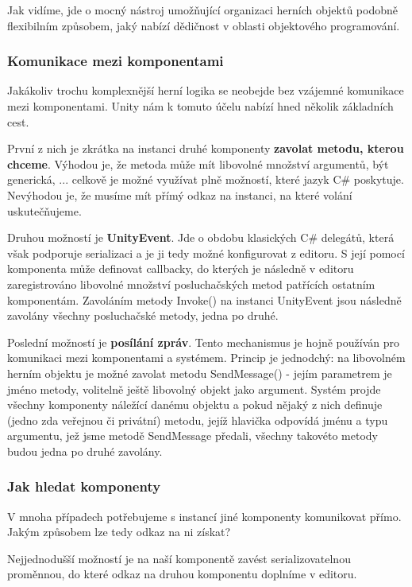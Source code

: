 Jak vidíme, jde o mocný nástroj umožňující organizaci herních objektů podobně flexibilním způsobem, jaký nabízí dědičnost v oblasti objektového programování. 

\subsubsection*{Komunikace mezi komponentami} \label{communicationBetweenComponentsSubsubsection}

Jakákoliv trochu komplexnější herní logika se neobejde bez vzájemné komunikace mezi komponentami. Unity nám k tomuto účelu nabízí hned několik základních cest.

První z nich je zkrátka na instanci druhé komponenty \textbf{zavolat metodu, kterou chceme}. Výhodou je, že metoda může mít libovolné množství argumentů, být generická, ... celkově je možné využívat plně možností, které jazyk C\# poskytuje. Nevýhodou je, že musíme mít přímý odkaz na instanci, na které volání uskutečňujeme.

Druhou možností je \textbf{UnityEvent}. Jde o obdobu klasických C\# delegátů, která však podporuje serializaci a je ji tedy možné konfigurovat z editoru. S její pomocí komponenta může definovat callbacky, do kterých je následně v editoru zaregistrováno libovolné množství posluchačských metod patřících ostatním komponentám. Zavoláním metody Invoke() na instanci UnityEvent jsou následně zavolány všechny posluchačské metody, jedna po druhé.

Poslední možností je \textbf{posílání zpráv}. Tento mechanismus je hojně používán pro komunikaci mezi komponentami a systémem. Princip je jednodchý: na libovolném herním objektu je možné zavolat metodu SendMessage() - jejím parametrem je jméno metody, volitelně ještě libovolný objekt jako argument. Systém projde všechny komponenty náležící danému objektu a pokud nějaký z nich definuje (jedno zda veřejnou či privátní) metodu, jejíž hlavička odpovídá jménu a typu argumentu, jež jsme metodě SendMessage předali, všechny takovéto metody budou jedna po druhé zavolány.

\subsubsection*{Jak hledat komponenty}

V mnoha případech potřebujeme s instancí jiné komponenty komunikovat přímo. Jakým způsobem lze tedy odkaz na ni získat?

Nejjednodušší možností je na naší komponentě zavést serializovatelnou proměnnou, do které odkaz na druhou komponentu doplníme v editoru. 

